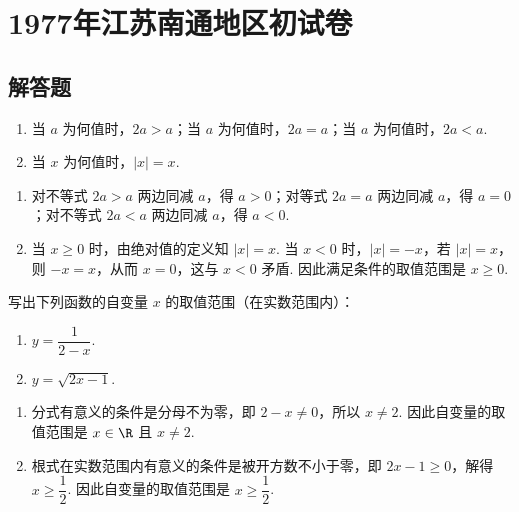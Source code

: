 \chapter{1977年江苏南通地区初试卷}

\section{解答题}

\begin{problem}
\begin{enumerate}
\item 当 \(a\) 为何值时，\(2a>a\)；当 \(a\) 为何值时，\(2a=a\)；当 \(a\) 为何值时，\(2a<a\).
\item 当 \(x\) 为何值时，\(|x|=x\).
\end{enumerate}
\end{problem}

\begin{solution}
\begin{enumerate}
\item 对不等式 \(2a>a\) 两边同减 \(a\)，得 \(a>0\)；对等式 \(2a=a\) 两边同减 \(a\)，得 \(a=0\)；对不等式 \(2a<a\) 两边同减 \(a\)，得 \(a<0\).

\item 当 \(x\geqslant0\) 时，由绝对值的定义知 \(|x|=x\). 当 \(x<0\) 时，\(|x|=-x\)，若 \(|x|=x\)，则 \(-x=x\)，从而 \(x=0\)，这与 \(x<0\) 矛盾. 因此满足条件的取值范围是 \(x\geqslant0\).
\end{enumerate}
\end{solution}

\begin{problem}
写出下列函数的自变量 \(x\) 的取值范围（在实数范围内）：

\begin{enumerate}
\item \(y=\dfrac{1}{2-x}\).
\item \(y=\sqrt{2x-1}\).
\end{enumerate}
\end{problem}

\begin{solution}
\begin{enumerate}
\item 分式有意义的条件是分母不为零，即 \(2-x\neq0\)，所以 \(x\neq2\). 因此自变量的取值范围是 \(x\in\R\) 且 \(x\neq2\).

\item 根式在实数范围内有意义的条件是被开方数不小于零，即 \(2x-1\geqslant0\)，解得 \(x\geqslant\dfrac12\). 因此自变量的取值范围是 \(x\geqslant\dfrac12\).
\end{enumerate}
\end{solution}

